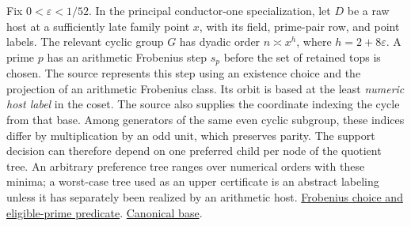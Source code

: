 \documentclass[12pt,letterpaper]{article}
\begin{document}
Fix \(0<\varepsilon<1/52\). In the principal conductor-one specialization, let \(D\) be a raw host at a sufficiently late family point \(x\), with its field, prime-pair row, and point labels. The relevant cyclic group \(G\) has dyadic order \(n\asymp x^h\), where \(h=2+8\varepsilon\). A prime \(p\) has an arithmetic Frobenius step \(s_p\) before the set of retained tops is chosen. The source represents this step using an existence choice and the projection of an arithmetic Frobenius class. Its orbit is based at the least \emph{numeric host label} in the coset. The source also supplies the coordinate indexing the cycle from that base. Among generators of the same even cyclic subgroup, these indices differ by multiplication by an odd unit, which preserves parity. The support decision can therefore depend on one preferred child per node of the quotient tree. An arbitrary preference tree ranges over numerical orders with these minima; a worst-case tree used as an upper certificate is an abstract labeling unless it has separately been realized by an arithmetic host.
\href{https://github.com/nousentllc/riemann-hypothesis/blob/40e56bab026552e089d7afcfeff08d2defb9c005/src/Development/AbelianVarietyTheory/Definitions/GlobalTwisting/ThinScalesIffHostBound.lean#L19-L41}{Frobenius choice and eligible-prime predicate}.
\href{https://github.com/nousentllc/riemann-hypothesis/blob/40e56bab026552e089d7afcfeff08d2defb9c005/src/Formalism/LocalToGlobal/GlobalTheory/IsResidueClassZero.lean#L264-L275}{Canonical base}.
\end{document}
